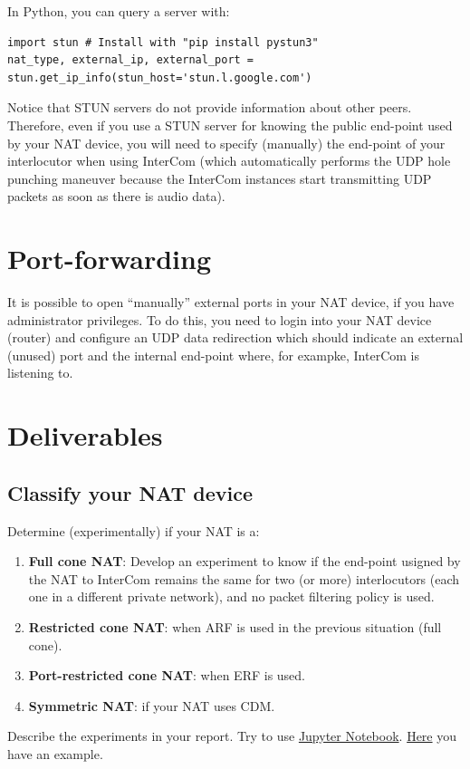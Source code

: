 In Python, you can query a server with:
\begin{verbatim}
import stun # Install with "pip install pystun3"
nat_type, external_ip, external_port = stun.get_ip_info(stun_host='stun.l.google.com')
\end{verbatim}

Notice that STUN servers do not provide information about other
peers. Therefore, even if you use a STUN server for knowing the public
end-point used by your NAT device, you will need to specify (manually)
the end-point of your interlocutor when using InterCom (which
automatically performs the UDP hole punching maneuver because the
InterCom instances start transmitting UDP packets as soon as there is
audio data).

\section{Port-forwarding}

It is possible to open ``manually'' external ports in your NAT device,
if you have administrator privileges. To do this, you need to login
into your NAT device (router) and configure an UDP data redirection
which should indicate an external (unused) port and the internal
end-point where, for exampke, InterCom is listening to.

\section{Deliverables}

\subsection*{Classify your NAT device}
Determine (experimentally) if your NAT is a:
\begin{enumerate}
\item \textbf{Full cone NAT}: Develop an experiment to know if the end-point
  usigned by the NAT to InterCom remains the same for two (or more)
  interlocutors (each one in a different private network), and no
  packet filtering policy is used.
\item \textbf{Restricted cone NAT}: when ARF is used in the previous situation (full cone).
\item \textbf{Port-restricted cone NAT}: when ERF is used.
\item \textbf{Symmetric NAT}: if your NAT uses CDM.
\end{enumerate}
Describe the experiments in your report. Try to use
\href{https://jupyter.org/}{Jupyter
  Notebook}. \href{https://github.com/Tecnologias-multimedia/InterCom/blob/master/docs/2-hours_seminar.ipynb}{Here}
you have an example.

